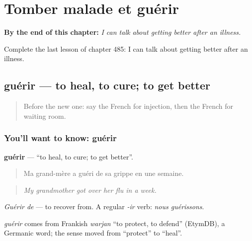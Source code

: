 
\chapter{Tomber malade et guérir}
\label{ch:fr-tomber-malade-et-guerir}

\begin{chapteropening}
\textbf{By the end of this chapter:} \emph{I can talk about getting better after an illness.}

Complete the last lesson of chapter 485: I can talk about getting better after an illness.
\end{chapteropening}

\section[guérir]{guérir — to heal, to cure; to get better}

\label{lesson:FR-C485-guerir}



\begin{quote}
Before the new one: say the French for injection, then the French for waiting room.
\end{quote}

\subsection*{You'll want to know: guérir}
\textbf{guérir} — \textquotedblleft{}to heal, to cure; to get better\textquotedblright{}.

\begin{quote}
Ma grand-mère a guéri de sa grippe en une semaine.
\end{quote}

\begin{quote}
\emph{My grandmother got over her flu in a week.}
\end{quote}

\emph{Guérir de} — to recover from. A regular \emph{-ir} verb: \emph{nous guérissons}.

\begin{cousinweb}
\emph{guérir} comes from Frankish \emph{warjan} \textquotedblleft{}to protect, to defend\textquotedblright{} (EtymDB), a Germanic word; the sense moved from \textquotedblleft{}protect\textquotedblright{} to \textquotedblleft{}heal\textquotedblright{}.
\end{cousinweb}

